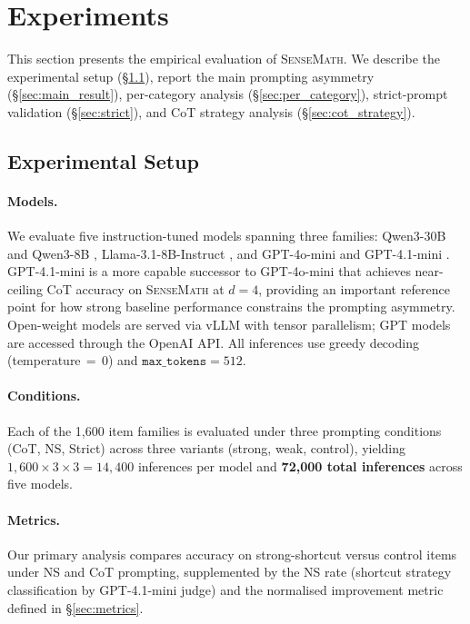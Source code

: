 \section{Experiments}
\label{sec:experiments}

This section presents the empirical evaluation of \textsc{SenseMath}.
We describe the experimental setup (\S\ref{sec:exp_setup}), report the main prompting asymmetry (\S\ref{sec:main_result}), per-category analysis (\S\ref{sec:per_category}), strict-prompt validation (\S\ref{sec:strict}), and CoT strategy analysis (\S\ref{sec:cot_strategy}).

\subsection{Experimental Setup}
\label{sec:exp_setup}

\paragraph{Models.}
We evaluate five instruction-tuned models spanning three families:
Qwen3-30B and Qwen3-8B \citep{qwen2025qwen3},
Llama-3.1-8B-Instruct \citep{grattafiori2024llama},
and GPT-4o-mini and GPT-4.1-mini \citep{openai2024gpt4o}.
GPT-4.1-mini is a more capable successor to GPT-4o-mini that achieves near-ceiling CoT accuracy on \textsc{SenseMath} at $d{=}4$, providing an important reference point for how strong baseline performance constrains the prompting asymmetry.
Open-weight models are served via vLLM with tensor parallelism; GPT models are accessed through the OpenAI API.
All inferences use greedy decoding (temperature$\,{=}\,0$) and $\texttt{max\_tokens}{=}512$.

\paragraph{Conditions.}
Each of the 1{,}600 item families is evaluated under three prompting conditions (CoT, NS, Strict) across three variants (strong, weak, control), yielding $1{,}600 \times 3 \times 3 = 14{,}400$ inferences per model and \textbf{72{,}000 total inferences} across five models.

\paragraph{Metrics.}
Our primary analysis compares accuracy on strong-shortcut versus control items under NS and CoT prompting, supplemented by the NS rate (shortcut strategy classification by GPT-4.1-mini judge) and the normalised improvement metric defined in \S\ref{sec:metrics}.

